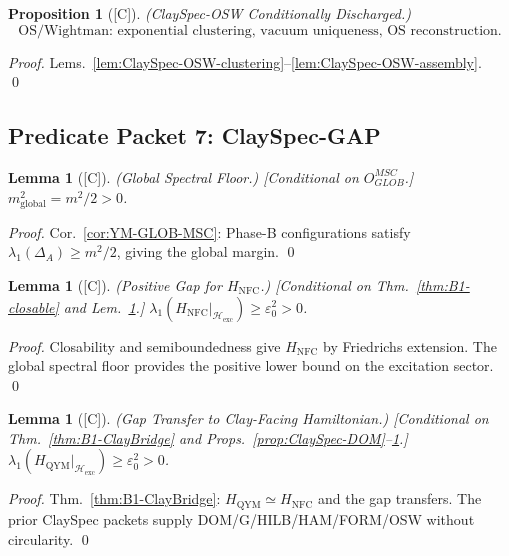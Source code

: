 \documentclass[12pt,oneside]{amsbook}
\theoremstyle{plain}
\newtheorem{lemma}[theorem]{Lemma}
\newtheorem{proposition}[theorem]{Proposition}
\theoremstyle{definition}
\theoremstyle{remark}
\newcommand{\status}[1]{\textup{[#1]}}
\begin{document}
\begin{proposition}[\status{C}]\label{prop:ClaySpec-OSW}
\textup{(ClaySpec-OSW Conditionally Discharged.)}
\[
 \boxed{\text{OS/Wightman: exponential clustering, vacuum uniqueness,
 OS reconstruction.}}
\]
\end{proposition}

\begin{proof}
Lems.~\ref{lem:ClaySpec-OSW-clustering}--\ref{lem:ClaySpec-OSW-assembly}.
\qed
\end{proof}

\subsection{Predicate Packet 7: ClaySpec-GAP}

\begin{lemma}[\status{C}]\label{lem:ClaySpec-GAP-global-floor}
\textup{(Global Spectral Floor.)}
\textup{[Conditional on $O_{GLOB}^{MSC}$.]}
$m^2_{\mathrm{global}}=m^2/2>0$.
\end{lemma}

\begin{proof}
Cor.~\ref{cor:YM-GLOB-MSC}: Phase-B configurations satisfy
$\lambda_1(\Delta_A)\ge m^2/2$, giving the global margin.
\qed
\end{proof}

\begin{lemma}[\status{C}]\label{lem:ClaySpec-GAP-NFC-Hamiltonian}
\textup{(Positive Gap for $H_{\mathrm{NFC}}$.)}
\textup{[Conditional on Thm.~\ref{thm:B1-closable} and
Lem.~\ref{lem:ClaySpec-GAP-global-floor}.]}
$\lambda_1(H_{\mathrm{NFC}}|_{\mathcal{H}_{\mathrm{exc}}})\ge\varepsilon_0^2>0$.
\end{lemma}

\begin{proof}
Closability and semiboundedness give $H_{\mathrm{NFC}}$ by Friedrichs
extension. The global spectral floor provides the positive lower bound
on the excitation sector.
\qed
\end{proof}

\begin{lemma}[\status{C}]\label{lem:ClaySpec-GAP-QYM-transfer}
\textup{(Gap Transfer to Clay-Facing Hamiltonian.)}
\textup{[Conditional on Thm.~\ref{thm:B1-ClayBridge} and
Props.~\ref{prop:ClaySpec-DOM}--\ref{prop:ClaySpec-OSW}.]}
$\lambda_1(H_{\mathrm{QYM}}|_{\mathcal{H}_{\mathrm{exc}}})\ge\varepsilon_0^2>0$.
\end{lemma}

\begin{proof}
Thm.~\ref{thm:B1-ClayBridge}: $H_{\mathrm{QYM}}\simeq H_{\mathrm{NFC}}$
and the gap transfers.
The prior ClaySpec packets supply DOM/G/HILB/HAM/FORM/OSW without
circularity.
\qed
\end{proof}
\end{document}
